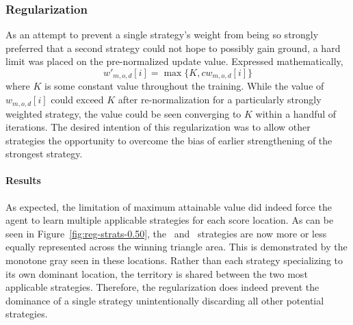 

\subsubsection*{Regularization}


As an attempt to prevent a single strategy's weight from being so strongly 
preferred that a second strategy could not hope to possibly gain ground,
a hard limit was placed on the pre-normalized update value.
%
Expressed mathematically,
\[
    w'_{m,o,d}[i] = \max\{K,cw_{m,o,d}[i]\}
\]
where $K$ is some constant value throughout the training.
%
While the value of $w_{m,o,d}[i]$ could exceed $K$ after re-normalization
for a particularly strongly weighted strategy,
the value could be seen converging to $K$ within a handful of iterations.
%
The desired intention of this regularization was to allow other strategies
the opportunity to overcome the bias of earlier strengthening of the strongest
strategy.

\paragraph*{Results}







As expected,
the limitation of maximum attainable value did indeed force the agent to learn
multiple applicable strategies for each score location.
%
As can be seen in Figure~\ref{fig:reg-strats-0.50},
the \handmaxmin\ and \handmaxavg\ strategies are now 
more or less equally represented across the winning triangle area.
%
This is demonstrated by the monotone gray seen in these locations.
%
Rather than each strategy specializing to its own dominant location,
the territory is shared between the two most applicable strategies.
%
Therefore,
the regularization does indeed prevent the dominance of a single strategy
unintentionally discarding all other potential strategies.

